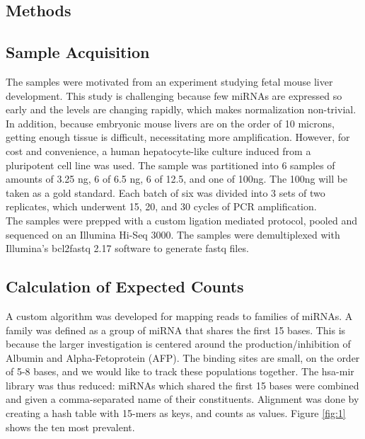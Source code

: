 \documentclass{bioinfo}
\begin{document}
\begin{methods}
\section{Methods}
\subsection{Sample Acquisition}
The samples were motivated from an experiment studying fetal mouse liver development. This study is challenging because few miRNAs are expressed so early and the levels are changing rapidly, which makes normalization non-trivial. In addition, because embryonic mouse livers are on the order of 10 microns, getting enough tissue is difficult, necessitating more amplification.\citep{Xu10}  However, for cost and convenience, a human hepatocyte-like culture induced from a pluripotent cell line was used. The sample was partitioned into 6 samples of amounts of 3.25 ng, 6 of 6.5 ng, 6 of 12.5, and one of 100ng. The 100ng will be taken as a gold standard. Each batch of six was divided into 3 sets of two replicates, which underwent 15, 20, and 30 cycles of PCR amplification.\vspace{4pt} \\  

The samples were prepped with a custom ligation mediated protocol, pooled and sequenced on an Illumina Hi-Seq 3000.  The samples were demultiplexed with Illumina's bcl2fastq 2.17 software to generate fastq files. 
\subsection{Calculation of Expected Counts}
A custom algorithm was developed for mapping reads to families of miRNAs. A family was defined as a group of miRNA that shares the first 15 bases. This is because the larger investigation is centered around the production/inhibition of Albumin and Alpha-Fetoprotein (AFP). The binding sites are small, on the order of 5-8 bases, and we would like to track these populations together. The hsa-mir library was thus reduced: miRNAs which shared the first 15 bases were combined and given a comma-separated name of their constituents.  Alignment was done by creating a hash table with 15-mers as keys, and counts as values.
Figure \ref{fig:1} shows the ten most prevalent. \\

\vspace{4pt} 
  

\end{methods}
\end{document}
